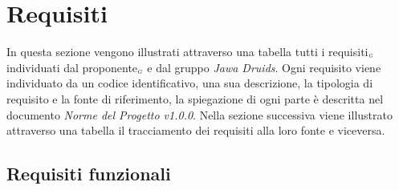 \chapter{Requisiti}\label{Requisiti}
In questa sezione vengono illustrati attraverso una tabella tutti i requisiti$_{\scaleto{G}{3pt}}$ individuati dal proponente$_{\scaleto{G}{3pt}}$ e dal gruppo \textit{Jawa Druids}. Ogni requisito viene individuato da un codice identificativo, una sua descrizione, la tipologia di requisito e la fonte di riferimento, la spiegazione di ogni parte è descritta nel documento \textit{Norme del Progetto v1.0.0}. Nella sezione successiva viene illustrato attraverso una tabella il tracciamento dei requisiti alla loro fonte e viceversa.

\section{Requisiti funzionali}\label{RequisitiFunzionali}

